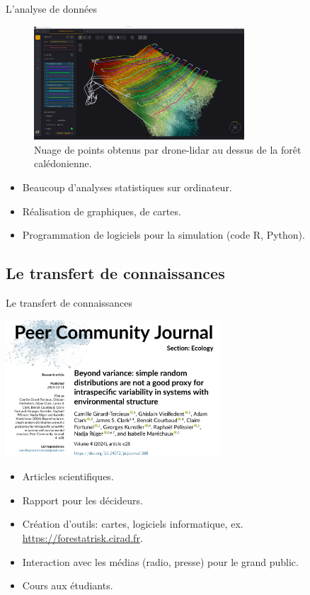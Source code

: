 \documentclass[10pt,table,dvipsnames,compress]{beamer}
\begin{document}
\begin{frame}[label={sec:orgd61a48d}]{L'analyse de données}
\begin{figure}[htbp]
\centering
\includegraphics[width=0.7\textwidth]{figs/drone-analyse-de-donnees.png}
\caption{Nuage de points obtenus par drone-lidar au dessus de la forêt calédonienne.}
\end{figure}

\begin{itemize}
\item Beaucoup d'analyses statistiques sur ordinateur.
\item Réalisation de graphiques, de cartes.
\item Programmation de logiciels pour la simulation (code R, Python).
\end{itemize}
\end{frame}
\subsection{Le transfert de connaissances}
\label{sec:org81fa170}

\begin{frame}[label={sec:org8fd3fe3}]{Le transfert de connaissances}
\begin{center}
\includegraphics[width=0.6\textwidth]{figs/ecriture-article-scientifique.png}
\end{center}

\begin{itemize}
\item Articles scientifiques.
\item Rapport pour les décideurs.
\item Création d'outils: cartes, logiciels informatique, ex. \url{https://forestatrisk.cirad.fr}.
\item Interaction avec les médias (radio, presse) pour le grand public.
\item Cours aux étudiants.
\end{itemize}
\end{frame}
\end{document}
